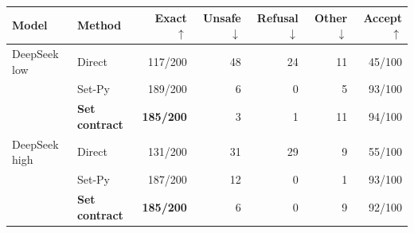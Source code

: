 \begin{tabular}{llrrrrr}
\toprule
Model & Method & Exact $\uparrow$ & Unsafe $\downarrow$ & Refusal $\downarrow$ & Other $\downarrow$ & Accept $\uparrow$ \\
\midrule
DeepSeek low & Direct & 117/200 & 48 & 24 & 11 & 45/100 \\
 & Set-Py & 189/200 & 6 & 0 & 5 & 93/100 \\
 & \textbf{Set contract} & \textbf{185/200} & 3 & 1 & 11 & 94/100 \\
\midrule
DeepSeek high & Direct & 131/200 & 31 & 29 & 9 & 55/100 \\
 & Set-Py & 187/200 & 12 & 0 & 1 & 93/100 \\
 & \textbf{Set contract} & \textbf{185/200} & 6 & 0 & 9 & 92/100 \\
\bottomrule
\end{tabular}
